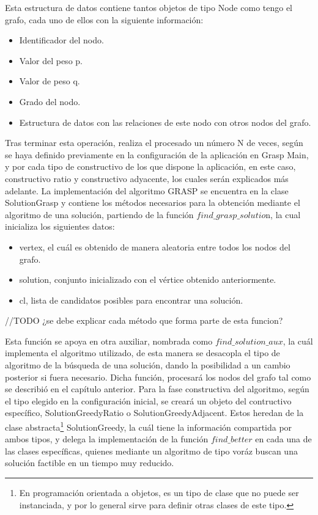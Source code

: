 Esta estructura de datos contiene tantos objetos de tipo Node como tengo el grafo, cada uno de ellos con la siguiente información:
 \begin{itemize}
	\item Identificador del nodo.
	\item Valor del peso p.
	\item Valor de peso q.
	\item Grado del nodo.
	\item Estructura de datos con las relaciones de este nodo con otros nodos del grafo.
\end{itemize}

Tras terminar esta operación, realiza el procesado un número N de veces, según se haya definido previamente en la configuración de la aplicación en Grasp Main, y por cada tipo de constructivo de los que dispone la aplicación, en este caso, constructivo ratio y constructivo adyacente, los cuales serán explicados más adelante. 
La implementación del algoritmo GRASP se encuentra en la clase SolutionGrasp y contiene los métodos necesarios para la obtención mediante el algoritmo de una solución, partiendo de la función $find\_grasp\_solutio$n, la cual inicializa los siguientes datos:
\begin{itemize}
	\item vertex, el cuál es obtenido de manera aleatoria entre todos los nodos del grafo.
	\item solution, conjunto inicializado con el vértice obtenido anteriormente.
	\item cl, lista de candidatos posibles para encontrar una solución.
\end{itemize}

//TODO ¿se debe explicar cada método que forma parte de esta funcion?

Esta función se apoya en otra auxiliar, nombrada como $ find\_solution\_aux $, la cuál implementa el algoritmo utilizado, de esta manera se desacopla el tipo de algoritmo de la búsqueda de una solución, dando la posibilidad a un cambio posterior si fuera necesario. Dicha función, procesará los nodos del grafo tal como se describió en el capítulo anterior. Para la fase constructiva del algoritmo, según el tipo elegido en la configuración inicial, se creará un objeto del contructivo específico, SolutionGreedyRatio o SolutionGreedyAdjacent. Estos heredan de la clase abstracta\footnote{En programación orientada a objetos, es un tipo de clase que no puede ser instanciada, y por lo general sirve para definir otras clases de este tipo.} SolutionGreedy, la cuál tiene la información compartida por ambos tipos, y delega la implementación de la función $find\_better$ en cada una de las clases específicas, quienes mediante un algoritmo de tipo voráz buscan una solución factible en un tiempo muy reducido.

